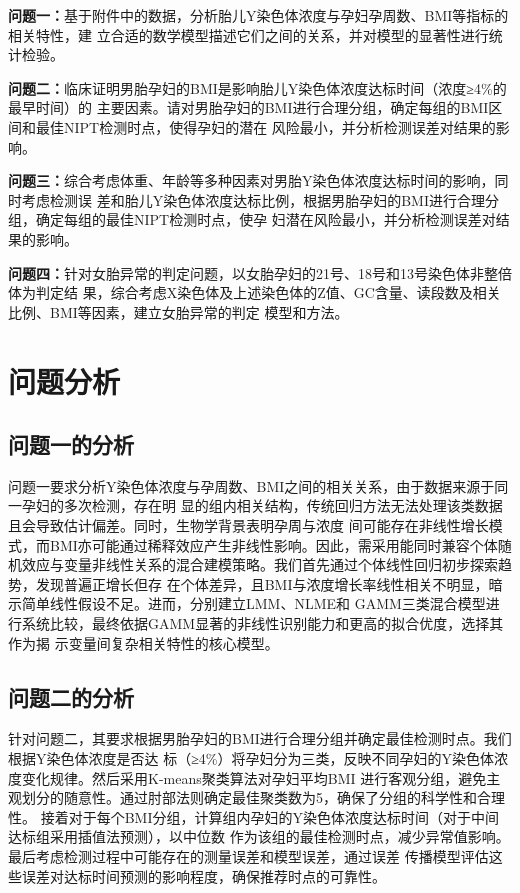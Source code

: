\documentclass{article}
\begin{document}
\textbf{问题一：}基于附件中的数据，分析胎儿Y染色体浓度与孕妇孕周数、BMI等指标的相关特性，建
立合适的数学模型描述它们之间的关系，并对模型的显著性进行统计检验。

\textbf{问题二：}临床证明男胎孕妇的BMI是影响胎儿Y染色体浓度达标时间（浓度≥4\%的最早时间）的
主要因素。请对男胎孕妇的BMI进行合理分组，确定每组的BMI区间和最佳NIPT检测时点，使得孕妇的潜在
风险最小，并分析检测误差对结果的影响。

\textbf{问题三：}综合考虑体重、年龄等多种因素对男胎Y染色体浓度达标时间的影响，同时考虑检测误
差和胎儿Y染色体浓度达标比例，根据男胎孕妇的BMI进行合理分组，确定每组的最佳NIPT检测时点，使孕
妇潜在风险最小，并分析检测误差对结果的影响。

\textbf{问题四：}针对女胎异常的判定问题，以女胎孕妇的21号、18号和13号染色体非整倍体为判定结
果，综合考虑X染色体及上述染色体的Z值、GC含量、读段数及相关比例、BMI等因素，建立女胎异常的判定
模型和方法。

\section{\textbf{问题分析}}
\subsection{\textbf{问题一的分析}}
问题一要求分析Y染色体浓度与孕周数、BMI之间的相关关系，由于数据来源于同一孕妇的多次检测，存在明
显的组内相关结构，传统回归方法无法处理该类数据且会导致估计偏差。同时，生物学背景表明孕周与浓度
间可能存在非线性增长模式，而BMI亦可能通过稀释效应产生非线性影响。因此，需采用能同时兼容个体随
机效应与变量非线性关系的混合建模策略。我们首先通过个体线性回归初步探索趋势，发现普遍正增长但存
在个体差异，且BMI与浓度增长率线性相关不明显，暗示简单线性假设不足。进而，分别建立LMM、NLME和
GAMM三类混合模型进行系统比较，最终依据GAMM显著的非线性识别能力和更高的拟合优度，选择其作为揭
示变量间复杂相关特性的核心模型。
\subsection{\textbf{问题二的分析}}
针对问题二，其要求根据男胎孕妇的BMI进行合理分组并确定最佳检测时点。我们根据Y染色体浓度是否达
标（≥4\%）将孕妇分为三类，反映不同孕妇的Y染色体浓度变化规律。然后采用K-means聚类算法对孕妇平均BMI
进行客观分组，避免主观划分的随意性。通过肘部法则确定最佳聚类数为5，确保了分组的科学性和合理性。
接着对于每个BMI分组，计算组内孕妇的Y染色体浓度达标时间（对于中间达标组采用插值法预测），以中位数
作为该组的最佳检测时点，减少异常值影响。最后考虑检测过程中可能存在的测量误差和模型误差，通过误差
传播模型评估这些误差对达标时间预测的影响程度，确保推荐时点的可靠性。
\end{document}
